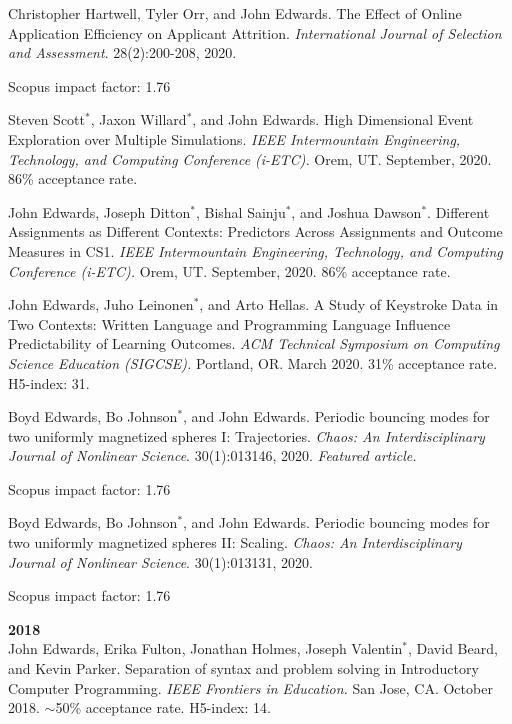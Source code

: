 \documentclass[margin,line]{res}
\newcommand{\pubunder}[1]{#1}
\begin{document}
\begin{resume}
Christopher Hartwell, Tyler Orr, and \pubunder{John Edwards}. The Effect of Online Application Efficiency on Applicant Attrition. \textit{International Journal of Selection and Assessment}. 28(2):200-208, 2020.
\begin{IMPACT}
Scopus impact factor: 1.76 %
\end{IMPACT}

Steven Scott$^*$, Jaxon Willard$^*$, and \pubunder{John Edwards}. High Dimensional Event Exploration over Multiple Simulations. \textit{IEEE Intermountain Engineering, Technology, and Computing Conference (i-ETC).} Orem, UT. September, 2020. 86\% acceptance rate.

John Edwards, Joseph Ditton$^*$, Bishal Sainju$^*$, and Joshua Dawson$^*$. Different Assignments as Different Contexts: Predictors Across Assignments and Outcome Measures in CS1. \textit{IEEE Intermountain Engineering, Technology, and Computing Conference (i-ETC).} Orem, UT. September, 2020. 86\% acceptance rate.

John Edwards, Juho Leinonen$^*$, and Arto Hellas. A Study of Keystroke Data in Two Contexts: Written Language and Programming Language Influence Predictability of Learning Outcomes.  \textit{ACM Technical Symposium on Computing Science Education (SIGCSE).} Portland, OR. March 2020.  31\% acceptance rate. H5-index: 31.

Boyd Edwards, Bo Johnson$^*$, and \pubunder{John Edwards}. Periodic bouncing modes for two uniformly magnetized spheres I: Trajectories. \textit{Chaos: An Interdisciplinary Journal of Nonlinear Science}. 30(1):013146, 2020. \textit{Featured article.}
\begin{IMPACT}
Scopus impact factor: 1.76 %
\end{IMPACT}

Boyd Edwards, Bo Johnson$^*$, and \pubunder{John Edwards}. Periodic bouncing modes for two uniformly magnetized spheres II: Scaling. \textit{Chaos: An Interdisciplinary Journal of Nonlinear Science}. 30(1):013131, 2020.
\begin{IMPACT}
Scopus impact factor: 1.76 %
\end{IMPACT}

\textbf{2018} \\
John Edwards, Erika Fulton, Jonathan Holmes, Joseph Valentin$^*$, David Beard, and Kevin Parker. Separation of syntax and problem solving in Introductory Computer Programming. \textit{IEEE Frontiers in Education.} San Jose, CA. October 2018.  $\sim$50\% acceptance rate. H5-index: 14.


\end{resume}
\end{document}

